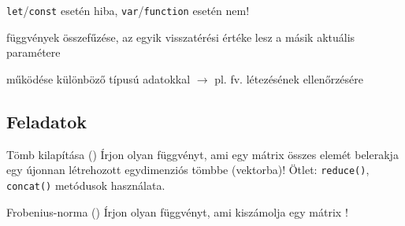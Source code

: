 \begin{frame}
  \footnotesize
  \begin{exampleblock}{ \texttt{let}/\texttt{const} esetén hiba, \texttt{var}/\texttt{function} esetén nem!}
      \scriptsize
      \vspace{-0.3cm}
      
      \vspace{-0.3cm}
  \end{exampleblock}
\end{frame}

\begin{frame}
  \begin{exampleblock}{ függvények összefűzése, az egyik visszatérési értéke lesz a másik aktuális paramétere}
      \footnotesize
      
  \end{exampleblock}
\end{frame}

\begin{frame}
  \begin{exampleblock}{ működése különböző típusú adatokkal $\to$ pl. fv. létezésének ellenőrzésére}
      
  \end{exampleblock}
\end{frame}

\subsection{Feladatok}

\begin{frame}
  \begin{exampleblock}{Tömb kilapítása ()}
    Írjon olyan függvényt, ami egy mátrix összes elemét belerakja egy újonnan létrehozott egydimenziós tömbbe (vektorba)! Ötlet: \texttt{reduce()}, \texttt{concat()} metódusok használata.
  \end{exampleblock}
  \vfill
  \begin{exampleblock}{Frobenius-norma ()}
    Írjon olyan függvényt, ami kiszámolja egy mátrix !
  \end{exampleblock}
\end{frame}


